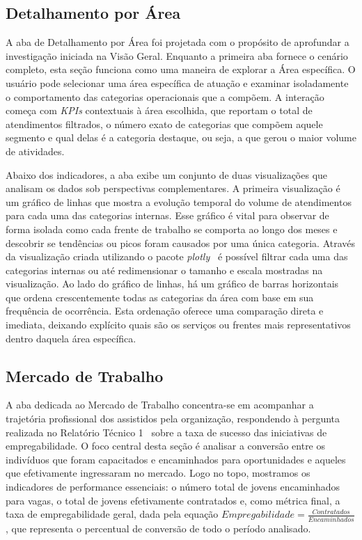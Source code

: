 \documentclass[12pt]{article}
\begin{document}
\subsection{Detalhamento por Área}
A aba de Detalhamento por Área foi projetada com o propósito de aprofundar a investigação iniciada na Visão Geral. Enquanto a primeira aba fornece o cenário completo, esta seção funciona como uma maneira de explorar a Área específica. O usuário pode selecionar uma área específica de atuação e examinar isoladamente o comportamento das categorias operacionais que a compõem. A interação começa com \textit{KPIs} contextuais à área escolhida, que reportam o total de atendimentos filtrados, o número exato de categorias que compõem aquele segmento e qual delas é a categoria destaque, ou seja, a que gerou o maior volume de atividades.

Abaixo dos indicadores, a aba exibe um conjunto de duas visualizações que analisam os dados sob perspectivas complementares. A primeira visualização é um gráfico de linhas que mostra a evolução temporal do volume de atendimentos para cada uma das categorias internas. Esse gráfico é vital para observar de forma isolada como cada frente de trabalho se comporta ao longo dos meses e descobrir se tendências ou picos foram causados por uma única categoria. Através da visualização criada utilizando o pacote \textit{plotly}~\cite{plotly} é possível filtrar cada uma das categorias internas ou até redimensionar o tamanho e escala mostradas na visualização. Ao lado do gráfico de linhas, há um gráfico de barras horizontais que ordena crescentemente todas as categorias da área com base em sua frequência de ocorrência. Esta ordenação oferece uma comparação direta e imediata, deixando explícito quais são os serviços ou frentes mais representativos dentro daquela área específica.


\subsection{Mercado de Trabalho}
A aba dedicada ao Mercado de Trabalho concentra-se em acompanhar a trajetória profissional dos assistidos pela organização, respondendo à pergunta realizada no Relatório Técnico 1~\cite{relatorio1} sobre a taxa de sucesso das iniciativas de empregabilidade. O foco central desta seção é analisar a conversão entre os indivíduos que foram capacitados e encaminhados para oportunidades e aqueles que efetivamente ingressaram no mercado. Logo no topo, mostramos os indicadores de performance essenciais: o número total de jovens encaminhados para vagas, o total de jovens efetivamente contratados e, como métrica final, a taxa de empregabilidade geral, dada pela equação $Empregabilidade = \frac{Contratados}{Encaminhados}$, que representa o percentual de conversão de todo o período analisado. 
\end{document}
